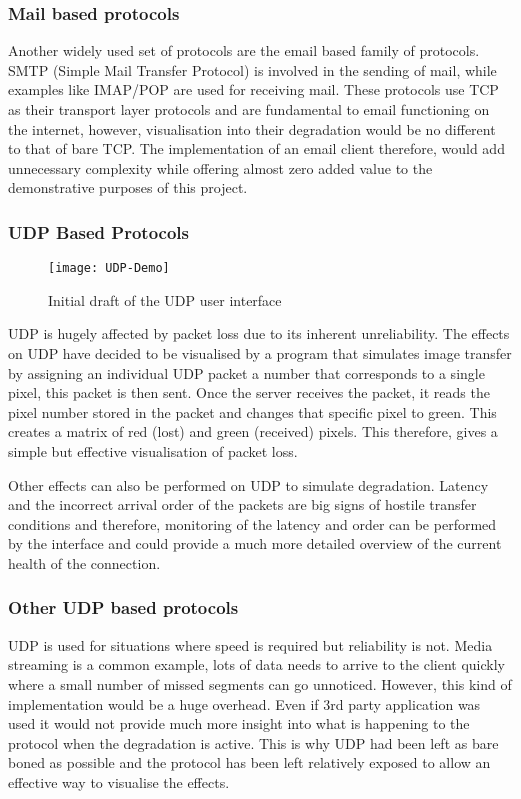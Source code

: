 \subsubsection*{Mail based protocols}
Another widely used set of protocols are the email based family of protocols. SMTP (Simple Mail Transfer Protocol) is involved in the sending of mail, while examples like IMAP/POP are used for receiving mail. These protocols use TCP as their transport layer protocols and are fundamental to email functioning on the internet, however, visualisation into their degradation would be no different to that of bare TCP. The implementation of an email client therefore, would add unnecessary complexity while offering almost zero added value to the demonstrative purposes of this project.


\subsubsection{UDP Based Protocols}
\begin{wrapfigure}{R}{5cm}
\begin{center}
	\texttt{[image: UDP-Demo]}
	\caption{Initial draft of the UDP user interface}
\end{center}
\end{wrapfigure}

UDP is hugely affected by packet loss due to its inherent unreliability. The effects on UDP have decided to be visualised by a program that simulates image transfer by assigning an individual UDP packet a number that corresponds to a single pixel, this packet is then sent. Once the server receives the packet, it reads the pixel number stored in the packet and changes that specific pixel to green. This creates a matrix of red (lost) and green (received) pixels. This therefore, gives a simple but effective visualisation of packet loss. 

Other effects can also be performed on UDP to simulate degradation. Latency and the incorrect arrival order of the packets are big signs of hostile transfer conditions and therefore, monitoring of the latency and order can be performed by the interface and could provide a much more detailed overview of the current health of the connection.

\subsubsection*{Other UDP based protocols}
UDP is used for situations where speed is required but reliability is not. Media streaming is a common example, lots of data needs to arrive to the client quickly where a small number of missed segments can go unnoticed. However, this kind of implementation would be a huge overhead. Even if 3rd party application was used it would not provide much more insight into what is happening to the protocol when the degradation is active. This is why UDP had been left as bare boned as possible and the protocol has been left relatively exposed to allow an effective way to visualise the effects.

